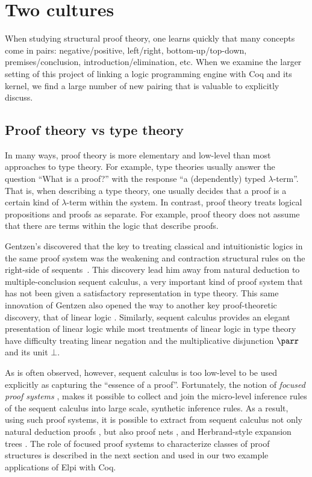 \section{Two cultures}

When studying structural proof theory, one learns quickly that many
concepts come in pairs: negative/positive, left/right,
bottom-up/top-down, premises/conclusion, introduction/elimination,
etc.  When we examine the larger setting of this project of linking a
logic programming engine with Coq and its kernel, we find a large
number of new pairing that is valuable to explicitly discuss.

\subsection{Proof theory vs type theory}

In many ways, proof theory is more elementary and low-level than most
approaches to type theory.  For example, type theories usually answer
the question ``What is a proof?'' with the response ``a (dependently)
typed $\lambda$-term''.  That is, when describing a type theory, one
usually decides that a proof is a certain kind of $\lambda$-term
within the system.  In contrast, proof theory treats logical
propositions and proofs as separate.  For example, proof theory does
not assume that there are terms within the logic that describe proofs.

Gentzen's discovered that the key to treating classical and
intuitionistic logics in the same proof system was the weakening and
contraction structural rules on the right-side of
sequents~\cite{gentzen35}.  This discovery lead him away from natural
deduction to multiple-conclusion sequent calculus, a very important
kind of proof system that has not been given a satisfactory
representation in type theory.  This same innovation of Gentzen also
opened the way to another key proof-theoretic discovery, that of
linear logic \cite{girard87tcs}.  Similarly, sequent calculus provides
an elegant presentation of linear logic while most treatments of
linear logic in type theory have difficulty treating linear negation
and the multiplicative disjunction $\lpar$ and its unit $\bot$.

As is often observed, however, sequent calculus is too low-level to be
used explicitly as capturing the ``essence of a proof''.  Fortunately,
the notion of \emph{focused proof systems}
\cite{andreoli92jlc,liang09tcs}, makes it possible to collect and join
the micro-level inference rules of the sequent calculus into large
scale, synthetic inference rules.  As a result, using such proof
systems, it is possible to extract from sequent calculus not only
natural deduction proofs \cite{pimentel16lsfa}, but also proof nets
\cite{chaudhuri08tcs}, and Herbrand-style expansion trees
\cite{chaudhuri16jlc}.  The role of focused proof systems to
characterize classes of proof structures is described in the next
section and used in our two example applications of Elpi with Coq.

